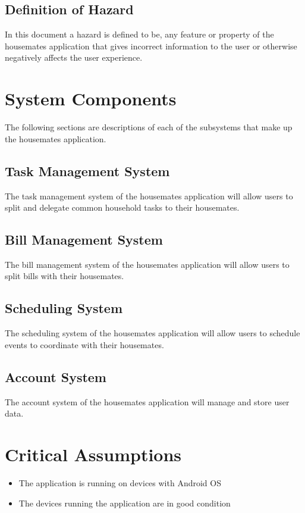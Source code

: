 \documentclass{article}
\begin{document}
\subsection{Definition of Hazard}

In this document a hazard is defined to be, any feature or property of the housemates application that gives incorrect information to the user or otherwise negatively affects the user experience.


\section{System Components}

The following sections are descriptions of each of the subsystems that make up the housemates application. 

\subsection{Task Management System}
The task management system of the housemates application will allow users to split and delegate common household tasks to their housemates.

\subsection{Bill Management System}
The bill management system of the housemates application will allow users to split bills with their housemates.

\subsection{Scheduling System}
The scheduling system of the housemates application will allow users to schedule events to coordinate with their housemates.

\subsection{Account System}
The account system of the housemates application will manage and store user data.

\section{Critical Assumptions}

\begin{itemize}
    \item The application is running on devices with Android OS
    \item The devices running the application are in good condition
\end{itemize}
\end{document}
